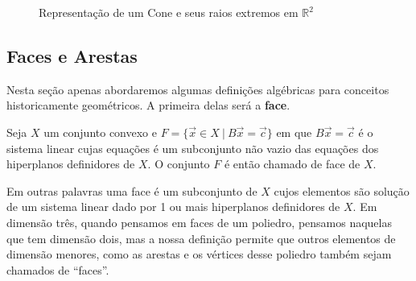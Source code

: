 \begin{figure}[H]
\centering
{}
\caption{Representação de um Cone e seus raios extremos em \(\mathbb{R}^2\)}

\label{fig:cone}
\end{figure}

\subsection{Faces e Arestas}

Nesta seção apenas abordaremos algumas definições algébricas para conceitos
historicamente geométricos. A primeira delas será a \textbf{face}.

\begin{def:face}
	Seja $X$ um conjunto convexo e $F = \{\vec{x} \in X\ |\ B\vec{x} = \vec{c}\}$
	em que $B\vec{x} = \vec{c}$ é o sistema linear cujas equações é um subconjunto
	não vazio das equações dos hiperplanos definidores de $X$. O conjunto $F$ é
	então chamado de face de $X$.
\end{def:face}

Em outras palavras uma face é um subconjunto de $X$ cujos elementos são solução
de um sistema linear dado por 1 ou mais hiperplanos definidores de $X$. Em dimensão três,
quando pensamos em faces de um poliedro, pensamos naquelas que tem dimensão dois,
mas a nossa definição permite que outros elementos de dimensão menores, como as
arestas e os vértices desse poliedro também sejam chamados de ``faces''.

